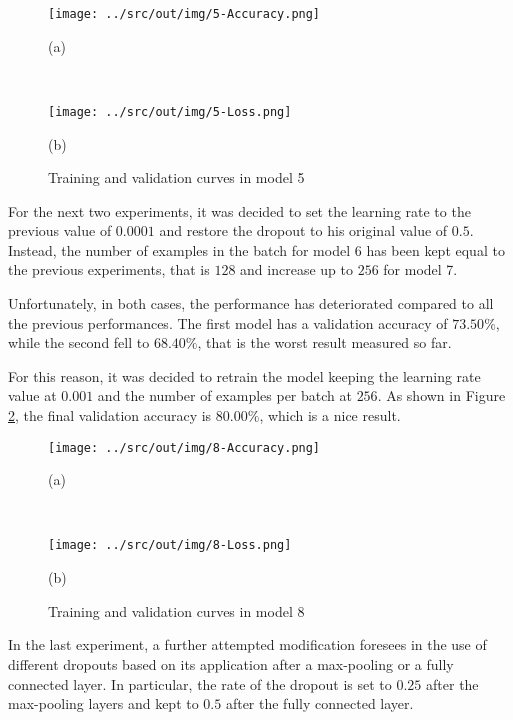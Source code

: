 \documentclass[a4paper,12pt]{article} %
\begin{document}
	\begin{figure}[htb]
		\begin{minipage}[c]{.49\textwidth}
			\centering
			\texttt{[image: ../src/out/img/5-Accuracy.png]}
			\caption*{(a)}
		\end{minipage}
		~
		\begin{minipage}[c]{.49\textwidth}
			\centering
			\texttt{[image: ../src/out/img/5-Loss.png]}
			\caption*{(b)}
		\end{minipage}
		\caption{Training and validation curves in model 5}
		\label{fig:model5-performance}
	\end{figure}

	For the next two experiments, it was decided to set the learning rate to 
	the previous value of $0.0001$ and restore the dropout to his original 
	value of $0.5$. Instead, the number of examples in the batch for model 6 
	has been kept equal to the previous experiments, that is $128$ and increase 
	up to $256$ for model 7. 

	Unfortunately, in both cases, the performance has deteriorated compared to 
	all the previous performances. The first model has a validation accuracy of 
	$73.50\%$, while the second fell to $68.40\%$, that is the worst result
	measured so far.
	\newline
	
	For this reason, it was decided to retrain the model keeping the learning 
	rate value at $0.001$ and the number of examples per batch at $256$.
	As shown in Figure \ref{fig:model8-performance}, the final validation 
	accuracy is $80.00\%$, which is a nice result.
	\newline
	
	\begin{figure}[htb]
		\begin{minipage}[c]{.49\textwidth}
			\centering
			\texttt{[image: ../src/out/img/8-Accuracy.png]}
			\caption*{(a)}
		\end{minipage}
		~
		\begin{minipage}[c]{.49\textwidth}
			\centering
			\texttt{[image: ../src/out/img/8-Loss.png]}
			\caption*{(b)}
		\end{minipage}
		\caption{Training and validation curves in model 8}
		\label{fig:model8-performance}
	\end{figure}

	In the last experiment, a further attempted modification foresees in the 
	use 
	of different dropouts based on its application after a max-pooling or a 
	fully connected layer. In particular, the rate of the dropout is set to 
	$0.25$ after the max-pooling layers and kept to $0.5$ after the fully 
	connected layer.
	
\end{document}
